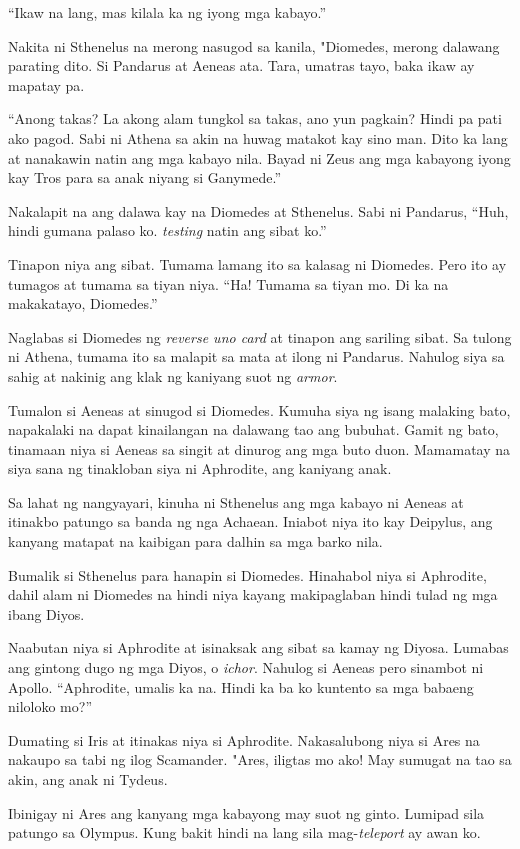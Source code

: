 \documentclass[12pt,letterpaper]{report}
\begin{document}
``Ikaw na lang, mas kilala ka ng iyong mga kabayo.''

Nakita ni Sthenelus na merong nasugod sa kanila, "Diomedes, merong dalawang parating dito. Si Pandarus at Aeneas ata. Tara, umatras tayo, baka ikaw ay mapatay pa.

``Anong takas? La akong alam tungkol sa takas, ano yun pagkain? Hindi pa pati ako pagod. Sabi ni Athena sa akin na huwag matakot kay sino man. Dito ka lang at nanakawin natin ang mga kabayo nila. Bayad ni Zeus ang mga kabayong iyong kay Tros para sa anak niyang si Ganymede.''

Nakalapit na ang dalawa kay na Diomedes at Sthenelus. Sabi ni Pandarus, ``Huh, hindi gumana palaso ko. \textit{testing} natin ang sibat ko.''

Tinapon niya ang sibat. Tumama lamang ito sa kalasag ni Diomedes. Pero ito ay tumagos at tumama sa tiyan niya. ``Ha! Tumama sa tiyan mo. Di ka na makakatayo, Diomedes.''

Naglabas si Diomedes ng \textit{reverse uno card} at tinapon ang sariling sibat. Sa tulong ni Athena, tumama ito sa malapit sa mata at ilong ni Pandarus. Nahulog siya sa sahig at nakinig ang klak ng kaniyang suot ng \textit{armor}.

Tumalon si Aeneas at sinugod si Diomedes. Kumuha siya ng isang malaking bato, napakalaki na dapat kinailangan na dalawang tao ang bubuhat. Gamit ng bato, tinamaan niya si Aeneas sa singit at dinurog ang mga buto duon. Mamamatay na siya sana ng tinakloban siya ni Aphrodite, ang kaniyang anak.

Sa lahat ng nangyayari, kinuha ni Sthenelus ang mga kabayo ni Aeneas at itinakbo patungo sa banda ng nga Achaean. Iniabot niya ito kay Deipylus, ang kanyang matapat na kaibigan para dalhin sa mga barko nila.

Bumalik si Sthenelus para hanapin si Diomedes. Hinahabol niya si Aphrodite, dahil alam ni Diomedes na hindi niya kayang makipaglaban hindi tulad ng mga ibang Diyos.

Naabutan niya si Aphrodite at isinaksak ang sibat sa kamay ng Diyosa. Lumabas ang gintong dugo ng mga Diyos, o \textit{ichor}. Nahulog si Aeneas pero sinambot ni Apollo. ``Aphrodite, umalis ka na. Hindi ka ba ko kuntento sa mga babaeng niloloko mo?''

Dumating si Iris at itinakas niya si Aphrodite. Nakasalubong niya si Ares na nakaupo sa tabi ng ilog Scamander. "Ares, iligtas mo ako! May sumugat na tao sa akin, ang anak ni Tydeus.

Ibinigay ni Ares ang kanyang mga kabayong may suot ng ginto. Lumipad sila patungo sa Olympus. Kung bakit hindi na lang sila mag-\textit{teleport} ay awan ko.
\end{document}
